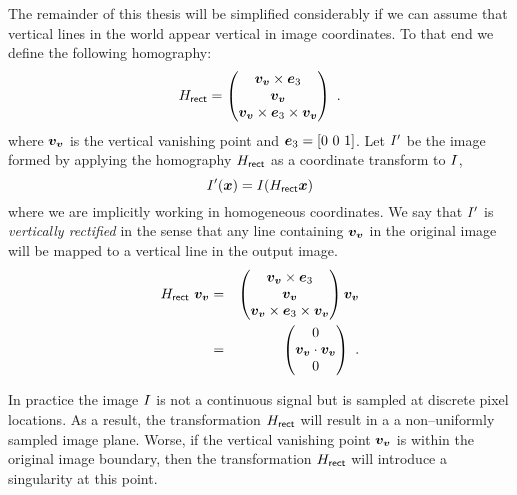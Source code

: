 The remainder of this thesis will be simplified considerably if we can
assume that vertical lines in the world appear vertical in image
coordinates. To that end we define the following homography:
\begin{equation}
  \label{eq:rectifier}
  \Rectifier =
  \begin{pmatrix}
    \vvpt \times \ez \\
    \vvpt \\
    \vvpt \times \ez \times \vvpt
  \end{pmatrix} ~.
\end{equation}
where $\vvpt$ is the vertical vanishing point and $\ez=[0~0~1]$.
Let $\Image'$ be the image formed by applying the homography $\Rectifier$ as a
coordinate transform to $\Image$,
\begin{equation}
  \label{eq:rectification}
  \Image'(\vect{x}) = \Image(\Rectifier \vect{x})
\end{equation}
where we are implicitly working in homogeneous coordinates. We say
that $\Image'$ is \textit{vertically rectified} in the sense that any
line containing $\vvpt$ in the original image will be mapped to a
vertical line in the output image. 
\begin{eqnarray}
  \Rectifier ~ \vvpt &=&   
    \begin{pmatrix}
      \vvpt \times \ez \\
      \vvpt \\
      \vvpt \times \ez \times \vvpt
    \end{pmatrix} \vvpt \\
  &=&
    \begin{pmatrix}
      0 \\ \vvpt \cdot \vvpt \\ 0
    \end{pmatrix} ~.
\end{eqnarray}

In practice the image $\Image$ is not a continuous signal but is
sampled at discrete pixel locations. As a result, the transformation
$\Rectifier$ will result in a a non--uniformly sampled image
plane. Worse, if the vertical vanishing point $\vvpt$ is within the
original image boundary, then the transformation $\Rectifier$ will
introduce a singularity at this point.

